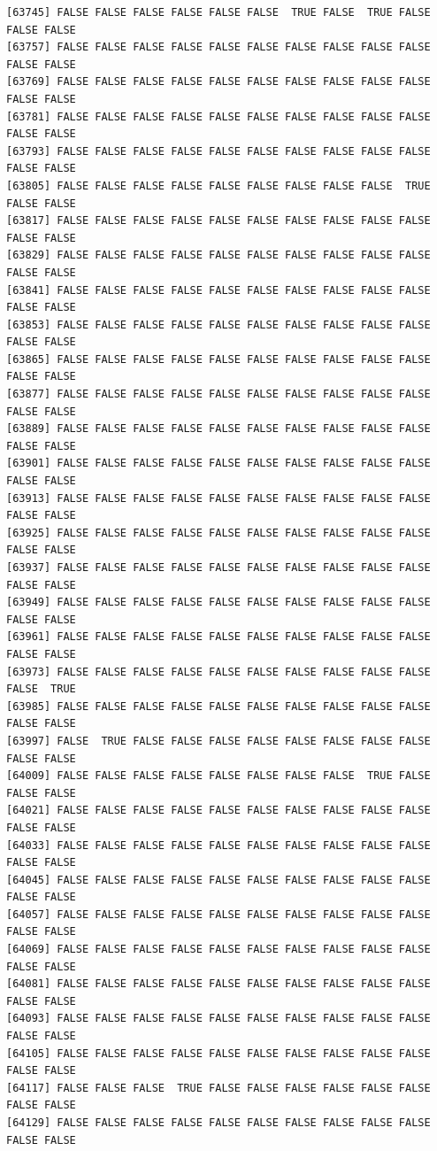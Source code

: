 \documentclass[
  a4paper,
  DIV=11,
  numbers=noendperiod]{scrartcl}
\begin{document}
\begin{verbatim}
[63745] FALSE FALSE FALSE FALSE FALSE FALSE  TRUE FALSE  TRUE FALSE FALSE FALSE
[63757] FALSE FALSE FALSE FALSE FALSE FALSE FALSE FALSE FALSE FALSE FALSE FALSE
[63769] FALSE FALSE FALSE FALSE FALSE FALSE FALSE FALSE FALSE FALSE FALSE FALSE
[63781] FALSE FALSE FALSE FALSE FALSE FALSE FALSE FALSE FALSE FALSE FALSE FALSE
[63793] FALSE FALSE FALSE FALSE FALSE FALSE FALSE FALSE FALSE FALSE FALSE FALSE
[63805] FALSE FALSE FALSE FALSE FALSE FALSE FALSE FALSE FALSE  TRUE FALSE FALSE
[63817] FALSE FALSE FALSE FALSE FALSE FALSE FALSE FALSE FALSE FALSE FALSE FALSE
[63829] FALSE FALSE FALSE FALSE FALSE FALSE FALSE FALSE FALSE FALSE FALSE FALSE
[63841] FALSE FALSE FALSE FALSE FALSE FALSE FALSE FALSE FALSE FALSE FALSE FALSE
[63853] FALSE FALSE FALSE FALSE FALSE FALSE FALSE FALSE FALSE FALSE FALSE FALSE
[63865] FALSE FALSE FALSE FALSE FALSE FALSE FALSE FALSE FALSE FALSE FALSE FALSE
[63877] FALSE FALSE FALSE FALSE FALSE FALSE FALSE FALSE FALSE FALSE FALSE FALSE
[63889] FALSE FALSE FALSE FALSE FALSE FALSE FALSE FALSE FALSE FALSE FALSE FALSE
[63901] FALSE FALSE FALSE FALSE FALSE FALSE FALSE FALSE FALSE FALSE FALSE FALSE
[63913] FALSE FALSE FALSE FALSE FALSE FALSE FALSE FALSE FALSE FALSE FALSE FALSE
[63925] FALSE FALSE FALSE FALSE FALSE FALSE FALSE FALSE FALSE FALSE FALSE FALSE
[63937] FALSE FALSE FALSE FALSE FALSE FALSE FALSE FALSE FALSE FALSE FALSE FALSE
[63949] FALSE FALSE FALSE FALSE FALSE FALSE FALSE FALSE FALSE FALSE FALSE FALSE
[63961] FALSE FALSE FALSE FALSE FALSE FALSE FALSE FALSE FALSE FALSE FALSE FALSE
[63973] FALSE FALSE FALSE FALSE FALSE FALSE FALSE FALSE FALSE FALSE FALSE  TRUE
[63985] FALSE FALSE FALSE FALSE FALSE FALSE FALSE FALSE FALSE FALSE FALSE FALSE
[63997] FALSE  TRUE FALSE FALSE FALSE FALSE FALSE FALSE FALSE FALSE FALSE FALSE
[64009] FALSE FALSE FALSE FALSE FALSE FALSE FALSE FALSE  TRUE FALSE FALSE FALSE
[64021] FALSE FALSE FALSE FALSE FALSE FALSE FALSE FALSE FALSE FALSE FALSE FALSE
[64033] FALSE FALSE FALSE FALSE FALSE FALSE FALSE FALSE FALSE FALSE FALSE FALSE
[64045] FALSE FALSE FALSE FALSE FALSE FALSE FALSE FALSE FALSE FALSE FALSE FALSE
[64057] FALSE FALSE FALSE FALSE FALSE FALSE FALSE FALSE FALSE FALSE FALSE FALSE
[64069] FALSE FALSE FALSE FALSE FALSE FALSE FALSE FALSE FALSE FALSE FALSE FALSE
[64081] FALSE FALSE FALSE FALSE FALSE FALSE FALSE FALSE FALSE FALSE FALSE FALSE
[64093] FALSE FALSE FALSE FALSE FALSE FALSE FALSE FALSE FALSE FALSE FALSE FALSE
[64105] FALSE FALSE FALSE FALSE FALSE FALSE FALSE FALSE FALSE FALSE FALSE FALSE
[64117] FALSE FALSE FALSE  TRUE FALSE FALSE FALSE FALSE FALSE FALSE FALSE FALSE
[64129] FALSE FALSE FALSE FALSE FALSE FALSE FALSE FALSE FALSE FALSE FALSE FALSE

\end{verbatim}
\end{document}
